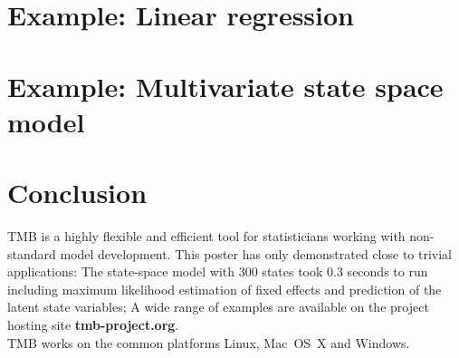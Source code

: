 \documentclass[largefonts]{sciposter}
\begin{document}
\begin{multicols}{3}



\section{Example: Linear regression}


\section{Example: Multivariate state space model}


\section{Conclusion}
TMB is a highly flexible and efficient tool for statisticians working
with non-standard model development. This poster has only demonstrated
close to trivial applications: The state-space model with 300 states
took 0.3 seconds to run including maximum likelihood estimation of
fixed effects and prediction of the latent state variables; A wide
range of examples are available on the project hosting site \textbf{tmb-project.org}.\\
TMB works on the common platforms Linux, \mbox{Mac OS X} and Windows.
\end{multicols}
\end{document}
